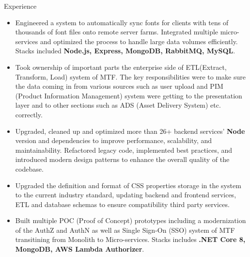 \documentclass{resume} %
\begin{document}
\begin{rSection}{Experience}
\begin{itemize}
\begin{itemize}
        \item Engineered a system to automatically sync fonts for clients with tens of thousands of font files onto remote server farms. Integrated multiple micro-services and optimized the process to handle large data volumes efficiently. Stacks included \textbf{Node.js, Express, MongoDB, RabbitMQ, MySQL}.
        \item Took ownership of important parts the enterprise side of ETL(Extract, Transform, Load) system of MTF. The key responsibilities were to make sure the data coming in from various sources such as user upload and PIM (Product Information Management) system were getting to the presentation layer and to other sections such as ADS (Asset Delivery System) etc. correctly.
        \item Upgraded, cleaned up and optimized more than 26+ backend services' \textbf{Node} version and dependencies to improve performance, scalability, and maintainability. Refactored legacy code, implemented best practices, and introduced modern design patterns to enhance the overall quality of the codebase.
        \item Upgraded the definition and format of CSS properties storage in the system to the current industry standard, updating backend and frontend services, ETL and database schemas to ensure compatibility third party services.
        \item Built multiple POC (Proof of Concept) prototypes including a modernization of the AuthZ and AuthN as well as Single Sign-On (SSO) system of MTF transitining from Monolith to Micro-services. Stacks includes \textbf{.NET Core 8, MongoDB, AWS Lambda Authorizer}.
      \end{itemize}
 \end{itemize}
 

\end{rSection}
\end{document}
